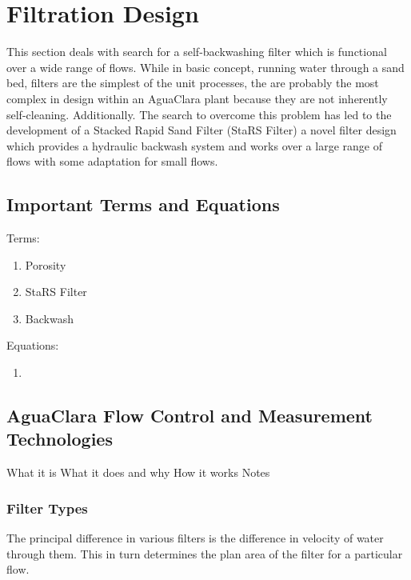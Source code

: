\documentclass[letterpaper,10pt,english]{sphinxmanual}
\begin{document}
\chapter{Filtration Design}
\label{\detokenize{Filtration/Filtration_Design:filtration-design}}\label{\detokenize{Filtration/Filtration_Design:title-filtration}}\label{\detokenize{Filtration/Filtration_Design::doc}}
This section deals with search for a self-backwashing filter which is functional over a wide range of flows. While in basic concept, running water through a sand bed, filters are the simplest of the unit processes, the are probably the most complex in design within an AguaClara plant because they are not inherently self-cleaning. Additionally. The search to overcome this problem has led to the development of a Stacked Rapid Sand Filter (StaRS Filter) a novel filter design which provides a hydraulic backwash system and works over a large range of flows with some adaptation for small flows.


\section{Important Terms and Equations}
\label{\detokenize{Filtration/Filtration_Design:important-terms-and-equations}}\label{\detokenize{Filtration/Filtration_Design:heading-filtration-terms}}
Terms:
\begin{enumerate}
\item {} 
Porosity

\item {} 
StaRS Filter

\item {} 
Backwash

\end{enumerate}

Equations:
\begin{enumerate}
\item {} 
\end{enumerate}


\section{AguaClara Flow Control and Measurement Technologies}
\label{\detokenize{Filtration/Filtration_Design:aguaclara-flow-control-and-measurement-technologies}}\label{\detokenize{Filtration/Filtration_Design:heading-aguaclara-filtration-technologies}}
What it is
What it does and why
How it works
Notes


\subsection{Filter Types}
\label{\detokenize{Filtration/Filtration_Design:filter-types}}\label{\detokenize{Filtration/Filtration_Design:heading-filter-types}}
The principal difference in various filters is the difference in velocity of water through them. This in turn determines the plan area of the filter for a particular flow.
\end{document}
